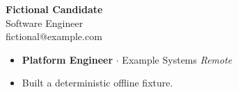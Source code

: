 \documentclass[10pt,letterpaper]{article}
\begin{document}
\begin{center}
  {\LARGE\textbf{Fictional Candidate}}\\[2pt]
  Software Engineer\\[2pt]
  {\small fictional@example.com}
\end{center}
\begin{itemize}
  \item \textbf{Platform Engineer} $\cdot$ Example Systems \textit{Remote}
  \item Built a deterministic offline fixture.
\end{itemize}
\end{document}
